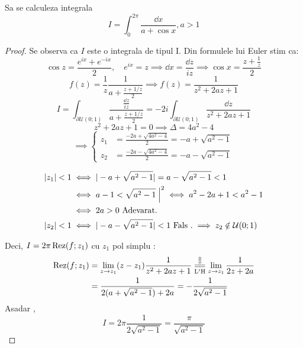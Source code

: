     \begin{aplicatie}
        Sa se calculeza integrala
        \[
            I = \int_{0}^{2 \pi} \frac{\dd x}{a + \cos x}, a>1
        \]
        \begin{proof}
            Se observa ca $I$ este o integrala de tipul $\mathrm{I}$.
            Din formulele lui Euler stim ca:
            \[
                \cos z = \frac{e^{ix}+e^{-ix}}{2}
                , \quad e^{ix} = z \implies \dd x = \frac{\dd z}{iz}
                        \implies \cos x = \frac{z+\frac{1}{z}}{2}
            \]
            \[
                f(z) = \frac{1}{z} \frac{1}{a + \frac{z + 1/z}{2}}
                \implies f(z) = \frac{1}{z^2 + 2az + 1}
            \]
            \[
                I = \int_{\partial\mathcal{U}(0;1)} \frac{\frac{\dd z}{iz}}{a + \frac{z + 1/z}{2}}
                  = - 2i \int_{\partial\mathcal{U}(0;1)} \frac{\dd z}{z^2 + 2az + 1}
            \]
            \[
                z^2 + 2az + 1 = 0 \implies \Delta = 4 a^2 - 4
            \]
            \[
                \implies \left \{
                \begin{aligned}
                    z_1 &= \frac{-2a + \sqrt{4a^2-4}}{2} = -a + \sqrt{a^2 - 1}  \\
                    z_2 &= \frac{-2a - \sqrt{4a^2-4}}{2} = -a - \sqrt{a^2 - 1}
                \end{aligned}
                \right .
            \]

            \begin{align*}
                |z_1| < 1 &\iff |-a + \sqrt{a^2 - 1 }| = a - \sqrt{a^2 -1} < 1 \\
                          &\iff a-1 < \sqrt{a^2 -1} \; \Big{|}^2 \iff a^2 - 2a + 1 < a^2 -1 \\
                          &\iff 2a > 0 \text { Adevarat. }     \\
                |z_2| < 1 &\iff |-a - \sqrt{a^2 - 1 }| < 1 \text{ Fals .}
                \implies z_2 \notin \mathcal{U}(0;1)
            \end{align*}

            Deci, $I = 2 \pi \operatorname{Rez}(f;z_1)$ cu $z_1$ pol simplu :
            \begin{align*}
               \Rez(f;z_1)
                    &= \lim_{z\to z_1}(z-z_1)\frac{1}{z^2+2az+1}
                        \EqConformCaz
                        \lim_{z\to z_1}\frac{1}{2z+2a} \\
                    &= \frac{1}{2(a+\sqrt{a^2 - 1}) + 2a} = - \frac{1}{2\sqrt{a^2-1}}
            \end{align*}
            Asadar ,
            \[
                I = 2 \pi \frac{1}{2\sqrt{a^2 -1}} = \frac{\pi}{\sqrt{a^2-1}}
            \]
        \end{proof}
    \end{aplicatie}

